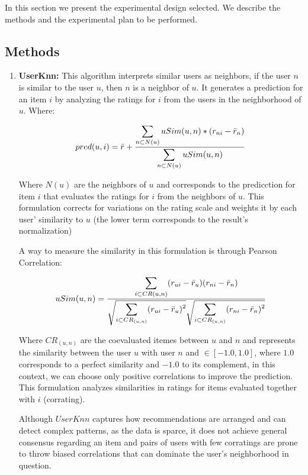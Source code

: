 \documentclass[letterpaper, 10 pt, conference]{ieeeconf}  %
\begin{document}
In this section we present the experimental design selected. We describe the methods and the experimental plan to be performed.\\


\subsection{Methods}
\begin{enumerate}

    \item \textbf{UserKnn: } This algorithm interprets similar users as neighbors, if the user $n$ is similar to the user $u$, then $n$ is a neighbor of $u$. It generates a prediction for an item $i$ by analyzing the ratings for $i$ from the users in the neighborhood of $u$. Where:
    
    \begin{equation}
        pred(u,i)=\Bar{r}+ \frac{\displaystyle \sum_{n \subset N(u)}uSim(u,n)*(r_{ni}-\Bar{r}_{n})}{\displaystyle \sum_{n \subset N(u)}uSim(u,n)}
    \end{equation}
    
    Where $N(u)$ are the neighbors of $u$ and corresponds to the predicction for item $i$ that evaluates the ratings for $i$ from the neighbors of $u$. This formulation corrects for variations on the rating scale and weights it by each user' similarity to $u$ (the lower term corresponds to the result's normalization)
    
    A way to measure the similarity in this formulation is through Pearson Correlation:
    
    \begin{equation}
        uSim(u,n)= \frac{\displaystyle \sum_{i \subset CR(u,n)}(r_{ui}-\Bar{r}_{u})(r_{ni}-\Bar{r}_{n})}{ \displaystyle \sqrt{\displaystyle \sum_{i \subset CR_{(u,n)}}(r_{ui}-\Bar{r}_{u})^2}  \sqrt{\displaystyle \sum_{i \subset CR_{(u,n)}}(r_{ni}-\Bar{r}_{n})^2} }
    \end{equation}
    
    Where $CR_{(u, n)} $ are the coevaluated itemes between $ u $ and $ n $ and represents the similarity between the user $ u $ with user  $ n $ and $ \in [-1.0, 1.0] $, where $ 1.0 $ corresponds to a perfect similarity and $ -1.0 $ to its complement, in this context, we can choose only positive correlations to improve the prediction. This formulation analyzes similarities in ratings for items evaluated together with $ i $ (corrating).
    
    Although $UserKnn$ captures how recommendations are arranged and can detect complex patterns, as the data is sparce, it does not achieve general consensus regarding an item and pairs of users with few corratings are prone to throw biased correlations that can dominate the user's neighborhood in question.
    

\end{enumerate}
\end{document}
